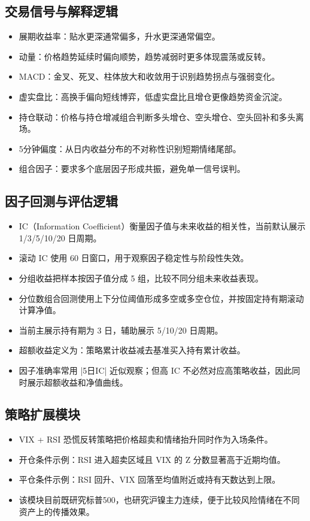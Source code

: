 \documentclass[11pt,a4paper]{ctexart}
\begin{document}
\subsection{交易信号与解释逻辑}
\begin{itemize}
\item 展期收益率：贴水更深通常偏多，升水更深通常偏空。
\item 动量：价格趋势延续时偏向顺势，趋势减弱时更多体现震荡或反转。
\item MACD：金叉、死叉、柱体放大和收敛用于识别趋势拐点与强弱变化。
\item 虚实盘比：高换手偏向短线博弈，低虚实盘比且增仓更像趋势资金沉淀。
\item 持仓联动：价格与持仓增减组合判断多头增仓、空头增仓、空头回补和多头离场。
\item 5分钟偏度：从日内收益分布的不对称性识别短期情绪尾部。
\item 组合因子：要求多个底层因子形成共振，避免单一信号误判。
\end{itemize}

\subsection{因子回测与评估逻辑}
\begin{itemize}
\item IC（Information Coefficient）衡量因子值与未来收益的相关性，当前默认展示 1/3/5/10/20 日周期。
\item 滚动 IC 使用 60 日窗口，用于观察因子稳定性与阶段性失效。
\item 分组收益把样本按因子值分成 5 组，比较不同分组未来收益表现。
\item 分位数组合回测使用上下分位阈值形成多空或多空仓位，并按固定持有期滚动计算净值。
\item 当前主展示持有期为 3 日，辅助展示 5/10/20 日周期。
\item 超额收益定义为：策略累计收益减去基准买入持有累计收益。
\item 因子准确率常用 |5日IC| 近似观察；但高 IC 不必然对应高策略收益，因此同时展示超额收益和净值曲线。
\end{itemize}

\subsection{策略扩展模块}
\begin{itemize}
\item VIX + RSI 恐慌反转策略把价格超卖和情绪抬升同时作为入场条件。
\item 开仓条件示例：RSI 进入超卖区域且 VIX 的 Z 分数显著高于近期均值。
\item 平仓条件示例：RSI 回升、VIX 回落至均值附近或持有天数达到上限。
\item 该模块目前既研究标普500，也研究沪镍主力连续，便于比较风险情绪在不同资产上的传播效果。
\end{itemize}
\end{document}
